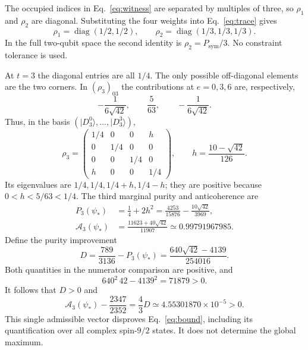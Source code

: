 \documentclass[aps,pra,reprint,onecolumn,notitlepage,longbibliography]{revtex4-2}
\newcommand{\ket}[1]{\lvert #1\rangle}
\newcommand{\A}{\mathcal A}
\begin{document}
The occupied indices in Eq.~\eqref{eq:witness} are separated by multiples of three, so $\rho_1$ and $\rho_2$ are diagonal. Substituting the four weights into Eq.~\eqref{eq:trace} gives
\begin{equation}
 \rho_1=\operatorname{diag}(1/2,1/2),\qquad
 \rho_2=\operatorname{diag}(1/3,1/3,1/3).
 \label{eq:feasible}
\end{equation}
In the full two-qubit space the second identity is $\rho_2=P_{\mathrm{sym}}/3$. No constraint tolerance is used.

At $t=3$ the diagonal entries are all $1/4$. The only possible off-diagonal elements are the two corners. In $(\rho_3)_{03}$ the contributions at $e=0,3,6$ are, respectively,
\begin{equation}
 -\frac1{6\sqrt{42}},\qquad \frac5{63},\qquad
 -\frac1{6\sqrt{42}}.
 \label{eq:interference}
\end{equation}
Thus, in the basis $(\ket{D_3^0},\ldots,\ket{D_3^3})$,
\begin{equation}
 \rho_3=
 \begin{pmatrix}
  1/4&0&0&h\\
  0&1/4&0&0\\
  0&0&1/4&0\\
  h&0&0&1/4
 \end{pmatrix},\qquad
 h=\frac{10-\sqrt{42}}{126}.
 \label{eq:rho3}
\end{equation}
Its eigenvalues are $1/4,1/4,1/4+h,1/4-h$; they are positive because $0<h<5/63<1/4$. The third marginal purity and anticoherence are
\begin{align}
 P_3(\psi_*)&=\frac14+2h^2
     =\frac{4253}{15876}-\frac{10\sqrt{42}}{3969},
     \label{eq:p3}\\
 \A_3(\psi_*)&=\frac{11623+40\sqrt{42}}{11907}
       \simeq0.99791967985.
     \label{eq:a3}
\end{align}
Define the purity improvement
\begin{equation}
 D=\frac{789}{3136}-P_3(\psi_*)
   =\frac{640\sqrt{42}-4139}{254016}.
 \label{eq:gap}
\end{equation}
Both quantities in the numerator comparison are positive, and
\begin{equation}
 640^2\,42-4139^2=71879>0.
 \label{eq:integer}
\end{equation}
It follows that $D>0$ and
\begin{equation}
 \A_3(\psi_*)-\frac{2347}{2352}=\frac43D
    \simeq4.55301870\times10^{-5}>0.
 \label{eq:strict}
\end{equation}
This single admissible vector disproves Eq.~\eqref{eq:bound}, including its quantification over all complex spin-$9/2$ states. It does not determine the global maximum.
\end{document}
